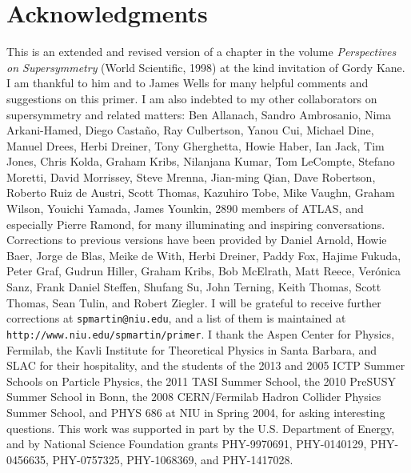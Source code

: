\documentclass[11pt]{article}
\begin{document}
\section*{Acknowledgments} This is an extended and revised version 
of a chapter in the volume {\it Perspectives on Supersymmetry} 
(World Scientific, 1998) at the kind invitation of Gordy Kane. I am 
thankful to him and to James Wells for many helpful comments and 
suggestions on this primer. I am also indebted to my other collaborators 
on supersymmetry and related matters:
Ben Allanach,
Sandro Ambrosanio,
Nima Arkani-Hamed,
Diego Casta\~no,
Ray Culbertson,
Yanou Cui,
Michael Dine,
Manuel Drees,
Herbi Dreiner,
Tony Gherghetta,
Howie Haber,
Ian Jack, 
Tim Jones,
Chris Kolda,
Graham Kribs,
Nilanjana Kumar,
Tom LeCompte,
Stefano Moretti,
David Morrissey,
Steve Mrenna,
Jian-ming Qian,
Dave Robertson,
Roberto Ruiz de Austri,
Scott Thomas,
Kazuhiro Tobe,
Mike Vaughn, 
Graham Wilson,
Youichi Yamada,
James Younkin,
2890 members of ATLAS,
and especially Pierre Ramond, for many illuminating and inspiring 
conversations. 
Corrections to 
previous versions have been provided by
Daniel Arnold,
Howie Baer,
Jorge de Blas,
Meike de With,
Herbi Dreiner,
Paddy Fox,
Hajime Fukuda,
Peter Graf,
Gudrun Hiller, 
Graham Kribs, 
Bob McElrath,
Matt Reece,
Ver\'onica Sanz,
Frank Daniel Steffen,
Shufang Su, 
John Terning, 
Keith Thomas, 
Scott Thomas, 
Sean Tulin,
and
Robert Ziegler. 
I will be grateful to receive further corrections at 
{\tt spmartin@niu.edu}, and a list of them is maintained at 
{\tt http://www.niu.edu/spmartin/primer}.
I thank the Aspen Center for Physics, Fermilab, the Kavli Institute 
for Theoretical Physics in Santa Barbara, and SLAC for their hospitality, 
and the students of 
the 2013 and 2005 ICTP Summer Schools on Particle Physics,
the 2011 TASI Summer School,
the 2010 PreSUSY Summer School in Bonn,
the 2008 CERN/Fermilab Hadron Collider Physics Summer School,
and PHYS 686 at NIU in Spring 2004,
for asking interesting questions. This work was supported in part by the U.S. 
Department of Energy, and by National Science Foundation 
grants PHY-9970691, PHY-0140129, PHY-0456635, PHY-0757325, PHY-1068369,
and PHY-1417028.


\end{document}
